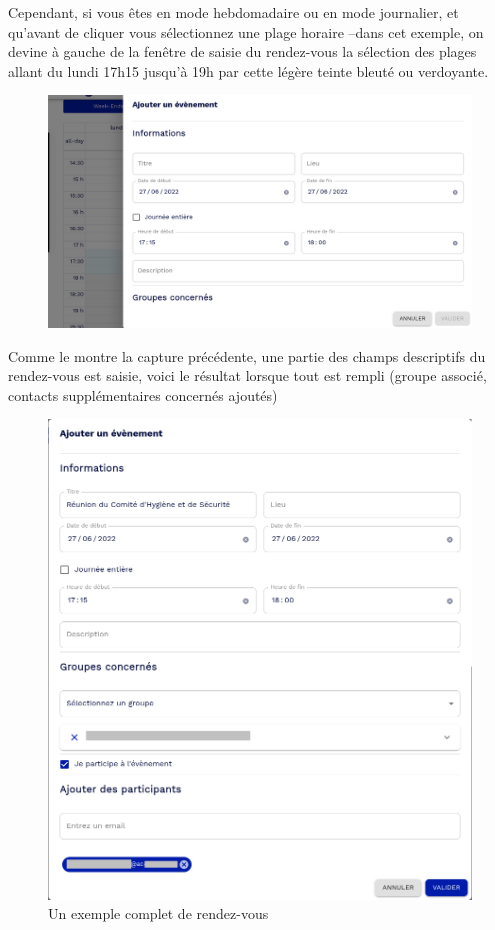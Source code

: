 Cependant, si vous êtes en mode hebdomadaire ou en mode journalier, et qu'avant de cliquer vous sélectionnez une plage horaire --dans cet exemple, on devine à gauche de la fenêtre de saisie du rendez-vous la sélection des plages allant du lundi 17h15 jusqu'à 19h par cette légère teinte bleuté ou verdoyante.
\begin{figure}
	\centering
	\includegraphics[width=0.500\linewidth]{./Captures/agenda.neo.rdv.selection.anterieure.png}
\end{figure}
Comme le montre la capture précédente, une partie des champs descriptifs du rendez-vous est saisie, voici le résultat lorsque tout est rempli (groupe associé, contacts supplémentaires concernés ajoutés)
\begin{figure}
	\centering
	\includegraphics[width=0.500\linewidth]{./Captures/agenda.rendez.vous.exemple.complet.png}
	\caption{Un exemple complet de rendez-vous}
\end{figure}

